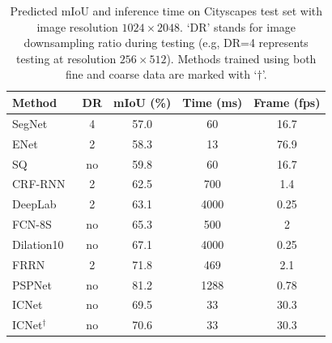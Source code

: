 \documentclass[runningheads]{llncs}
\begin{document}
\begin{table}[bpt]
	\setlength{\tabcolsep}{3pt}
	\caption{Predicted mIoU and inference time on Cityscapes test set with image resolution $1024 \times 2048$. `DR' stands for image downsampling ratio during testing (e.g, DR=4 represents testing at resolution $256 \times 512$). Methods trained using both fine and coarse data are marked with `$\dag$'.}
	\label{tab:cstestperformance}
	\begin{center}
		\begin{tabular}{l | c c c c}
			\toprule[1pt]
			Method & DR & mIoU (\%) & Time (ms) & Frame (fps) \\
			\hline
			\hline
			SegNet~\cite{badrinarayanan2015segnet} & 4 & 57.0 & 60 & 16.7 \\
			ENet~\cite{paszke2016enet} & 2 & 58.3 & 13 & 76.9 \\
			SQ~\cite{treml2016speeding} & no & 59.8 & 60 & 16.7 \\
			CRF-RNN~\cite{zheng2015conditional} & 2 & 62.5 & 700 & 1.4 \\
			DeepLab~\cite{chen2015semantic} & 2 & 63.1 & 4000 & 0.25 \\
			FCN-8S~\cite{long2015fully} & no & 65.3 & 500 & 2 \\
			Dilation10~\cite{yu2016multi} & no & 67.1 & 4000 & 0.25 \\
			FRRN~\cite{pohlen2017FRRN} & 2 & 71.8 & 469 & 2.1 \\
			PSPNet\footnotemark~\cite{zhao2017pspnet} & no & 81.2 & 1288 & 0.78 \\
			\hline
			\hline
			\rowcolor{Gray}
			ICNet & no & 69.5 & 33 & 30.3 \\
			\rowcolor{Gray}
			ICNet$^\dag$ & no & 70.6 & 33 & 30.3 \\
			\bottomrule[1pt]
		\end{tabular}
	\end{center}
\end{table}
\end{document}
